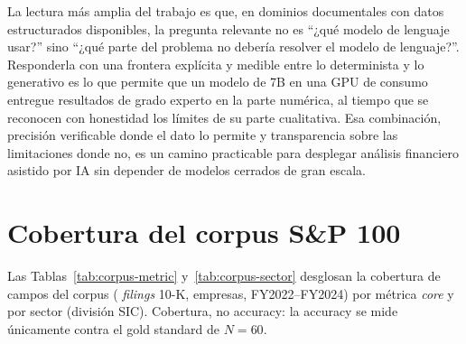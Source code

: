 \documentclass[conference]{IEEEtran}
\begin{document}
La lectura más amplia del trabajo es que, en dominios documentales con datos
estructurados disponibles, la pregunta relevante no es ``¿qué modelo de lenguaje
usar?'' sino ``¿qué parte del problema no debería resolver el modelo de
lenguaje?''. Responderla con una frontera explícita y medible entre lo
determinista y lo generativo es lo que permite que un modelo de 7B en una GPU de
consumo entregue resultados de grado experto en la parte numérica, al tiempo que
se reconocen con honestidad los límites de su parte cualitativa. Esa combinación,
precisión verificable donde el dato lo permite y transparencia sobre las
limitaciones donde no, es un camino practicable para desplegar análisis financiero
asistido por IA sin depender de modelos cerrados de gran escala.

\appendix
\section{Cobertura del corpus S\&P 100}
\label{sec:appendix-corpus}
Las Tablas~\ref{tab:corpus-metric} y~\ref{tab:corpus-sector} desglosan la
cobertura de campos del corpus (\corpusFilings{} \textit{filings} 10-K,
\corpusCompanies{} empresas, FY2022--FY2024) por métrica \textit{core} y
por sector (división SIC). Cobertura, no accuracy: la accuracy se mide
únicamente contra el gold standard de $N=60$.




\end{document}
